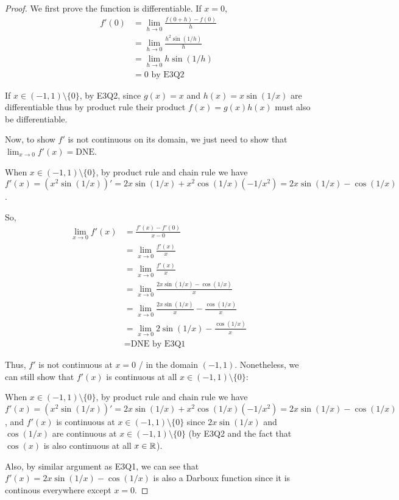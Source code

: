 \documentclass{homework}
\newcommand{\R}{\bb{R}} %
\newcommand{\ra}{\rightarrow}
\newcommand{\?}{\stackrel{?}{=}}
\theoremstyle{definition}
\begin{document}
\begin{proof}
    We first prove the function is differentiable. If $x=0$, 
    \begin{align*}
        f'(0)&=\lim_{h\ra0}\frac{f(0+h)-f(0)}{h}\\
        &=\lim_{h\ra0}\frac{h^2\sin(1/h)}{h}\\
        &=\lim_{h\ra0}h\sin(1/h)\\
        &=0\text{ by E3Q2}
    \end{align*}

    If $x\in(-1,1)\setminus\{0\}$, by E3Q2, since $g(x)=x$ and $h(x)=x\sin(1/x)$ are differentiable thus by product rule their product $f(x)=g(x)h(x)$ must also be differentiable.

    Now, to show $f'$ is not continuous on its domain, we just need to show that $\lim_{x\ra0}f'(x)=\text{DNE}$.

    When $x\in(-1,1)\setminus\{0\}$, by product rule and chain rule we have $f'(x)=(x^2\sin(1/x))'=2x\sin(1/x)+x^2\cos(1/x)(-1/x^2)=2x\sin(1/x)-\cos(1/x)$.

    So, \begin{align*}
        \lim_{x\ra0}f'(x)&=\frac{f'(x)-f'(0)}{x-0}\\
        &=\lim_{x\ra0}\frac{f'(x)}{x}\\
        &=\lim_{x\ra0}\frac{f'(x)}{x}\\
        &=\lim_{x\ra0}\frac{2x\sin(1/x)-\cos(1/x)}{x}\\
        &=\lim_{x\ra0}\frac{2x\sin(1/x)}{x}-\frac{\cos(1/x)}{x}\\
        &=\lim_{x\ra0}2\sin(1/x)-\frac{\cos(1/x)}{x}\\
        &=\text{DNE by E3Q1}
    \end{align*} 

    Thus, $f'$ is not continuous at $x=0$ / in the domain $(-1,1)$. Nonetheless, we can still show that $f'(x)$ is continuous at all $x\in(-1,1)\setminus\{0\}$: 

    When $x\in(-1,1)\setminus\{0\}$, by product rule and chain rule we have $f'(x)=(x^2\sin(1/x))'=2x\sin(1/x)+x^2\cos(1/x)(-1/x^2)=2x\sin(1/x)-\cos(1/x)$, and $f'(x)$ is continuous at $x\in(-1,1)\setminus\{0\}$ since $2x\sin(1/x)$ and $\cos(1/x)$ are continuous at $x\in(-1,1)\setminus\{0\}$ (by E3Q2 and the fact that $\cos(x)$ is also continuous at all $x\in\R$).

    Also, by similar argument as E3Q1, we can see that $f'(x)=2x\sin(1/x)-\cos(1/x)$ is also a Darboux function since it is continous everywhere except $x=0$. 


\end{proof}
\end{document}
